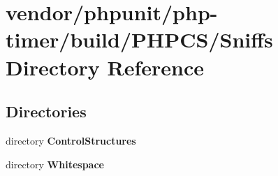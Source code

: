 \section{vendor/phpunit/php-\/timer/build/\+P\+H\+P\+C\+S/\+Sniffs Directory Reference}
\label{dir_d2b4a36cdfbd1298eadc3d9d9ad3a9bb}
\subsection*{Directories}
\begin{DoxyCompactItemize}
\item 
directory {\bf Control\+Structures}
\item 
directory {\bf Whitespace}
\end{DoxyCompactItemize}
